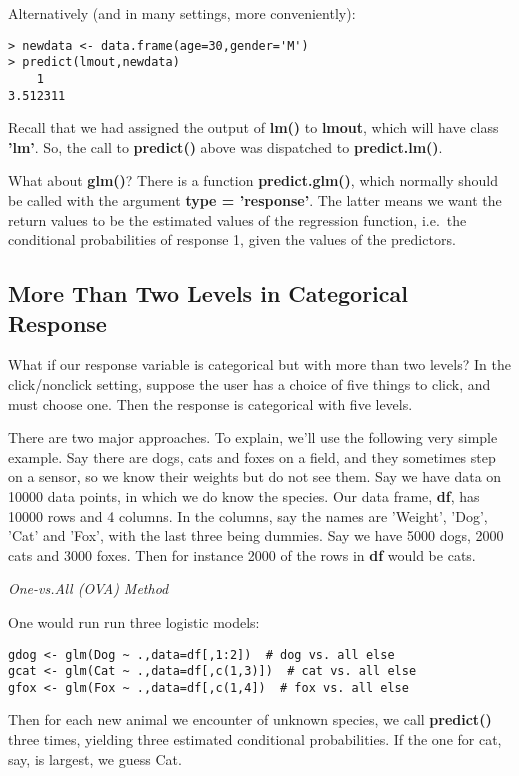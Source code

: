 Alternatively (and in many settings, more conveniently):

\begin{lstlisting}
> newdata <- data.frame(age=30,gender='M')
> predict(lmout,newdata)
    1 
3.512311 
\end{lstlisting}

Recall that we had assigned the output of \textbf{lm()} to
\textbf{lmout}, which will have class \textbf{'lm'}.  So, the call to
\textbf{predict()} above was dispatched to \textbf{predict.lm()}.

What about \textbf{glm()}?  There is a function \textbf{predict.glm()},
which normally should be called with the argument \textbf{type =
'response'}.  The latter means we want the return values to be the
estimated values of the regression function, i.e.\ the conditional
probabilities of response 1, given the values of the predictors.

\subsection{More Than Two Levels in Categorical Response}

What if our response variable is categorical but with more than two
levels?  In the click/nonclick setting, suppose the user has a choice of
five things to click, and must choose one.  Then the response is
categorical with five levels.  

There are two major approaches.  To explain, we'll use the following
very simple example. Say there are dogs, cats and foxes on a field, and
they sometimes step on a sensor, so we know their weights but do not see
them.  Say we have data on 10000 data points, in which we do know the
species.  Our data frame, \textbf{df}, has 10000 rows and 4 columns.  In
the columns, say the names are 'Weight', 'Dog', 'Cat' and 'Fox', with
the last three being dummies.  Say we have 5000 dogs, 2000 cats and 3000
foxes.  Then for instance 2000 of the rows in \textbf{df} would be cats.

\textit{One-vs.All (OVA) Method}

One would run run three logistic models:

\begin{lstlisting}
gdog <- glm(Dog ~ .,data=df[,1:2])  # dog vs. all else
gcat <- glm(Cat ~ .,data=df[,c(1,3)])  # cat vs. all else
gfox <- glm(Fox ~ .,data=df[,c(1,4])  # fox vs. all else
\end{lstlisting}

Then for each new animal we encounter of unknown species, we call
\textbf{predict()} three times, yielding three estimated conditional
probabilities.  If the one for cat, say, is largest, we guess Cat.

